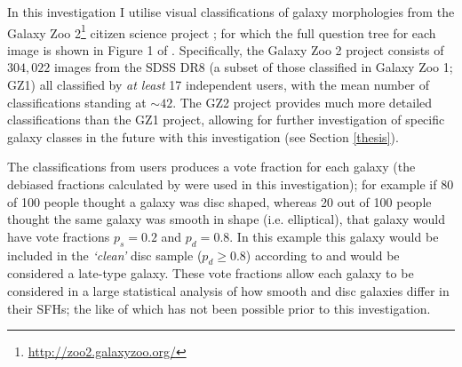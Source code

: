 \documentclass{mn2e}
\begin{document}
In this investigation I utilise visual classifications of galaxy morphologies from the Galaxy Zoo 2\footnote{\url{http://zoo2.galaxyzoo.org/}} citizen science project \citep{GZ2}; for which the full question tree for each image is shown in Figure 1 of \citet{GZ2}.  Specifically, the Galaxy Zoo 2 \citep{GZ2} project consists of $304, 022$ images from the SDSS DR8 (a subset of those classified in Galaxy Zoo 1; GZ1) all classified by \emph{at least} 17 independent users, with the mean number of classifications standing at $\sim42$. The GZ2 project provides much more detailed classifications than the GZ1 project, allowing for further investigation of specific galaxy classes in the future with this investigation (see Section \ref{thesis}). 



The classifications from users produces a vote fraction for each galaxy (the debiased fractions calculated by \citet{GZ2} were used in this investigation); for example if 80 of 100 people thought a galaxy was disc shaped, whereas 20 out of 100 people thought the same galaxy was smooth in shape (i.e. elliptical), that galaxy would have vote fractions $p_{s} = 0.2$ and $p_{d} = 0.8$. In this example this galaxy would be included in the \emph{`clean'} disc sample ($p_d \geq 0.8$) according to \cite{GZ2} and would be considered a late-type galaxy. These vote fractions allow each galaxy to be considered in a large statistical analysis of how smooth and disc galaxies differ in their SFHs; the like of which has not been possible prior to this investigation.
\end{document}
